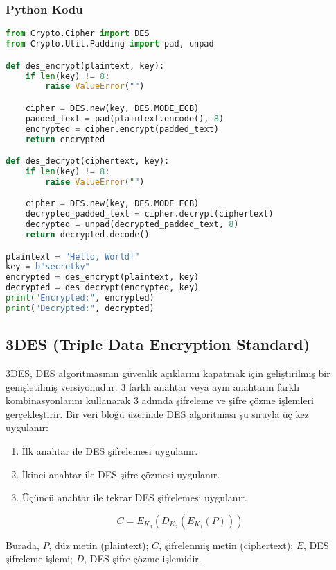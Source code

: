 \subsubsection{Python Kodu}

\begin{lstlisting}[language=Python]
from Crypto.Cipher import DES
from Crypto.Util.Padding import pad, unpad

def des_encrypt(plaintext, key):
    if len(key) != 8:
        raise ValueError("")

    cipher = DES.new(key, DES.MODE_ECB)
    padded_text = pad(plaintext.encode(), 8)
    encrypted = cipher.encrypt(padded_text)
    return encrypted

def des_decrypt(ciphertext, key):
    if len(key) != 8:
        raise ValueError("")

    cipher = DES.new(key, DES.MODE_ECB)
    decrypted_padded_text = cipher.decrypt(ciphertext)
    decrypted = unpad(decrypted_padded_text, 8)
    return decrypted.decode()

plaintext = "Hello, World!"
key = b"secretky"
encrypted = des_encrypt(plaintext, key)
decrypted = des_decrypt(encrypted, key)
print("Encrypted:", encrypted)
print("Decrypted:", decrypted)
\end{lstlisting}

\newpage

\subsection{3DES (Triple Data Encryption Standard)}

3DES, DES algoritmasının güvenlik açıklarını kapatmak için geliştirilmiş bir genişletilmiş versiyonudur. 3 farklı anahtar veya aynı anahtarın farklı kombinasyonlarını kullanarak 3 adımda şifreleme ve şifre çözme işlemleri gerçekleştirir. Bir veri bloğu üzerinde DES algoritması şu sırayla üç kez uygulanır:

\begin{enumerate}
    \item İlk anahtar ile DES şifrelemesi uygulanır.
    \item İkinci anahtar ile DES şifre çözmesi uygulanır.
    \item Üçüncü anahtar ile tekrar DES şifrelemesi uygulanır.
\end{enumerate}

\[ C = E_{K_3}(D_{K_2}(E_{K_1}(P)))\]

Burada, $P$, düz metin (plaintext); $C$, şifrelenmiş metin (ciphertext); $E$, DES şifreleme işlemi; $D$, DES şifre çözme işlemidir.

